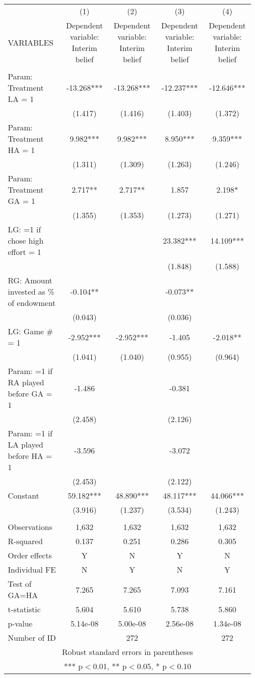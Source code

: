 \documentclass[]{article}
\begin{document}
\begin{tabular}{lcccc} \hline
 & (1) & (2) & (3) & (4) \\
VARIABLES & Dependent variable: Interim belief & Dependent variable: Interim belief & Dependent variable: Interim belief & Dependent variable: Interim belief \\ \hline
 &  &  &  &  \\
Param: Treatment LA = 1 & -13.268*** & -13.268*** & -12.237*** & -12.646*** \\
 & (1.417) & (1.416) & (1.403) & (1.372) \\
Param: Treatment HA = 1 & 9.982*** & 9.982*** & 8.950*** & 9.359*** \\
 & (1.311) & (1.309) & (1.263) & (1.246) \\
Param: Treatment GA = 1 & 2.717** & 2.717** & 1.857 & 2.198* \\
 & (1.355) & (1.353) & (1.273) & (1.271) \\
LG: =1 if chose high effort = 1 &  &  & 23.382*** & 14.109*** \\
 &  &  & (1.848) & (1.588) \\
RG: Amount invested as \% of endowment & -0.104** &  & -0.073** &  \\
 & (0.043) &  & (0.036) &  \\
LG: Game \# = 1 & -2.952*** & -2.952*** & -1.405 & -2.018** \\
 & (1.041) & (1.040) & (0.955) & (0.964) \\
Param: =1 if RA played before GA = 1 & -1.486 &  & -0.381 &  \\
 & (2.458) &  & (2.126) &  \\
Param: =1 if LA played before HA = 1 & -3.596 &  & -3.072 &  \\
 & (2.453) &  & (2.122) &  \\
Constant & 59.182*** & 48.890*** & 48.117*** & 44.066*** \\
 & (3.916) & (1.237) & (3.534) & (1.243) \\
 &  &  &  &  \\
Observations & 1,632 & 1,632 & 1,632 & 1,632 \\
R-squared & 0.137 & 0.251 & 0.286 & 0.305 \\
Order effects & Y & N & Y & N \\
Individual FE & N & Y & N & Y \\
Test of GA=HA & 7.265 & 7.265 & 7.093 & 7.161 \\
t-statistic & 5.604 & 5.610 & 5.738 & 5.860 \\
p-value & 5.14e-08 & 5.00e-08 & 2.56e-08 & 1.34e-08 \\
 Number of ID &  & 272 &  & 272 \\ \hline
\multicolumn{5}{c}{ Robust standard errors in parentheses} \\
\multicolumn{5}{c}{ *** p$<$0.01, ** p$<$0.05, * p$<$0.10} \\
\end{tabular}
\end{document}

